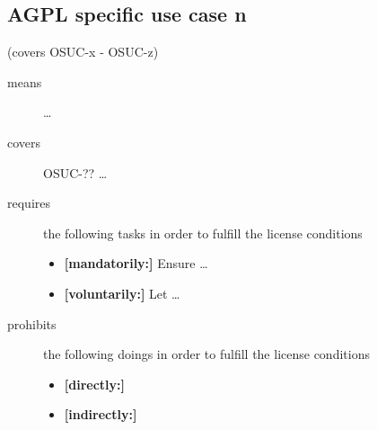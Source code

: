 \subsection{AGPL specific use case n}
(covers OSUC-x - OSUC-z)
\begin{description}
\item[means] \ldots

\item[covers] OSUC-?? \ldots

\item[requires] the following tasks in order to fulfill the license conditions
\begin{itemize}
  \item \textbf{[mandatorily:]} Ensure \ldots
  \item \textbf{[voluntarily:]} Let \ldots
\end{itemize}

\item[prohibits] the following doings in order to fulfill the license conditions
\begin{itemize}
  \item \textbf{[directly:]} 
  \item \textbf{[indirectly:]}
\end{itemize}
\end{description}

%
